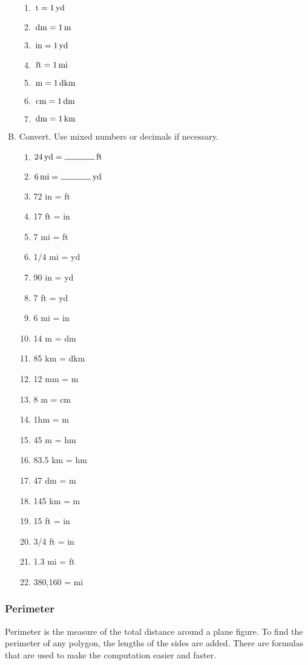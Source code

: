 \begin{enumerate}[A.]
\begin{enumerate}[1.]
	\item \Line $\,\mathrm{t} = 1\,\mathrm{yd}$
	\item \Line $\,\mathrm{dm} = 1\,\mathrm{m}$
	\item \Line $\,\mathrm{in} = 1 \,\mathrm{yd}$
	\item \Line $\,\mathrm{ft} = 1 \,\mathrm{mi}$
	\item \Line $\,\mathrm{m} = 1 \,\mathrm{dkm}$
	\item \Line $\,\mathrm{cm} = 1 \,\mathrm{dm}$
	\item \Line $\,\mathrm{dm} = 1 \,\mathrm{km}$
	\end{enumerate}
\item Convert. Use mixed numbers or decimals if necessary.
	\begin{multicols}{2}
	\begin{enumerate}[1.]
	\item $24 \yd = \Line \ft$
	\item $6 \mi = \Line \yd$
	\item 72 in =  ft
	\item 17 ft = \Line in
	\item 7 mi = \Line ft
	\item 1/4 mi = \Line yd
	\item 90 in = \Line yd
	\item 7 ft = \Line yd
	\item 6 mi = \Line in
	\item 14 m = \Line dm
	\item 85 km = \Line dkm
	\item 12 mm = \Line m
	\item 8 m = \Line cm
	\item 1hm = \Line m
	\item 45 m = \Line hm
	\item 83.5 km = \Line hm
	\item 47 dm = \Line m
	\item 145 km = \Line m
	\item 15 ft = \Line  in
	\item 3/4 ft = \Line in
	\item 1.3 mi = \Line ft
	\item 380,160 = \Line mi
	\end{enumerate}
	\end{multicols}
\end{enumerate}

\subsubsection*{Perimeter}
Perimeter is the measure of the total distance around a plane figure. To find the
perimeter of any polygon, the lengths of the sides are added. There are formulas that are
used to make the computation easier and faster.

